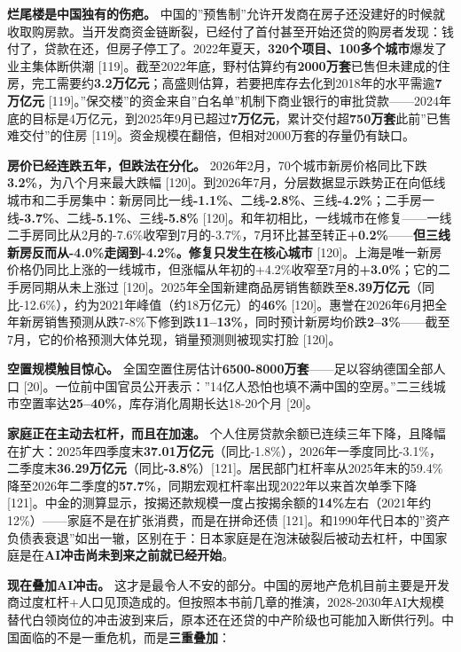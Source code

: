 \documentclass[11pt,a4paper]{ctexart}
\begin{document}
\textbf{烂尾楼是中国独有的伤疤。} 中国的”预售制”允许开发商在房子还没建好的时候就收取购房款。当开发商资金链断裂，已经付了首付甚至开始还贷的购房者发现：钱付了，贷款在还，但房子停工了。2022年夏天，\textbf{320个项目、100多个城市}爆发了业主集体断供潮 [119]。截至2022年底，野村估算约有\textbf{2000万套}已售但未建成的住房，完工需要约\textbf{3.2万亿元}；高盛则估算，若要把库存去化到2018年的水平需逾\textbf{7万亿元}{} [119]。”保交楼”的资金来自”白名单”机制下商业银行的审批贷款——2024年底的目标是4万亿元，到2025年9月已超过\textbf{7万亿元}，累计交付超\textbf{750万套}此前”已售难交付”的住房 [119]。资金规模在翻倍，但相对2000万套的存量仍有缺口。

\textbf{房价已经连跌五年，但跌法在分化。} 2026年2月，70个城市新房价格同比下跌\textbf{3.2\%}，为八个月来最大跌幅 [120]。到2026年7月，分层数据显示跌势正在向低线城市和二手房集中：新房同比一线\textbf{-1.1\%}、二线\textbf{-2.8\%}、三线\textbf{-4.2\%}；二手房一线\textbf{-3.7\%}、二线\textbf{-5.1\%}、三线\textbf{-5.8\%}{} [120]。和年初相比，一线城市在修复——一线二手房同比从2月的-7.6\%收窄到7月的-3.7\%，7月环比甚至转正\textbf{+0.2\%}——\textbf{但三线新房反而从-4.0\%走阔到-4.2\%。修复只发生在核心城市}{} [120]。上海是唯一新房价格仍同比上涨的一线城市，但涨幅从年初的+4.2\%收窄至7月的\textbf{+3.0\%}；它的二手房同期从未上涨过 [120]。2025年全国新建商品房销售额跌至\textbf{8.39万亿元}（同比-12.6\%），约为2021年峰值（约18万亿元）的\textbf{46\%}{} [120]。惠誉在2026年6月把全年新房销售预测从跌7-8\%下修到跌\textbf{11--13\%}，同时预计新房均价跌\textbf{2--3\%}——截至7月，它的价格预测大体兑现，销量预测则被现实打脸 [120]。

\textbf{空置规模触目惊心。} 全国空置住房估计\textbf{6500-8000万套}——足以容纳德国全部人口 [20]。一位前中国官员公开表示：”14亿人恐怕也填不满中国的空房。”二三线城市空置率达\textbf{25--40\%}，库存消化周期长达18-20个月 [20]。

\textbf{家庭正在主动去杠杆，而且在加速。} 个人住房贷款余额已连续三年下降，且降幅在扩大：2025年四季度末\textbf{37.01万亿元}（同比-1.8\%），2026年一季度同比-3.1\%，二季度末\textbf{36.29万亿元}（同比\textbf{-3.8\%}）[121]。居民部门杠杆率从2025年末的59.4\%降至2026年二季度的\textbf{57.7\%}，同期宏观杠杆率出现2022年以来首次单季下降 [121]。中金的测算显示，按揭还款规模一度占按揭余额的\textbf{14\%}左右（2021年约12\%）——家庭不是在扩张消费，而是在拼命还债 [121]。和1990年代日本的”资产负债表衰退”如出一辙，区别在于：日本家庭是在泡沫破裂后被动去杠杆，中国家庭是在\textbf{AI冲击尚未到来之前就已经开始}。

\textbf{现在叠加AI冲击。} 这才是最令人不安的部分。中国的房地产危机目前主要是开发商过度杠杆+人口见顶造成的。但按照本书前几章的推演，2028-2030年AI大规模替代白领岗位的冲击波到来后，原本还在还贷的中产阶级也可能加入断供行列。中国面临的不是一重危机，而是\textbf{三重叠加}：
\end{document}
